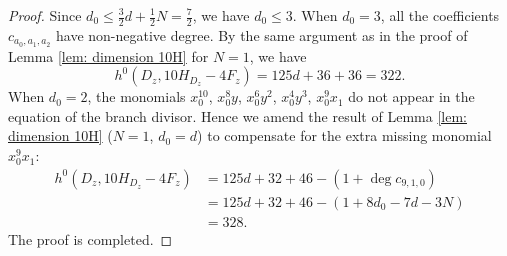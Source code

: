 \documentclass[a4paper,11pt]{amsart}
\theoremstyle{definition}
\theoremstyle{remark}
\numberwithin{equation}{section}
\begin{document}
\begin{proof}
    Since $d_0 \leq \frac{3}{2}d + \frac{1}{2}N = \frac{7}{2}$, we have $d_0 \leq 3$. When $d_0 = 3$, all the coefficients $c_{a_0, a_1, a_2}$ have non-negative degree. By the same argument as in the proof of Lemma \ref{lem: dimension 10H} for $N = 1$, we have
    $$
    h^0(D_z, 10H_{D_z} - 4F_z) = 125d + 36 + 36 = 322.
    $$
    When $d_0=2$, the monomials $x_0^{10}$, $x_0^8y$, $x_0^6y^2$, $x_0^4y^3$, $x_0^9x_1$ do not appear in the equation of the branch divisor. Hence we amend the result of Lemma \ref{lem: dimension 10H} ($N=1$, $d_0=d$) to compensate for the extra missing monomial $x_0^9x_1$:
    \begin{align*}
         h^0(D_z, 10H_{D_z} - 4F_z) & =125d + 32 + 46 - (1 + \deg c_{9,1,0}) \\ 
         & = 125d + 32 + 46 - (1 + 8d_0 - 7d - 3N) \\
         & = 328.
    \end{align*}
    The proof is completed.
\end{proof}
\end{document}
